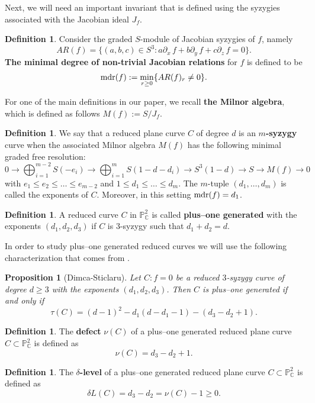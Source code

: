 \documentclass[11pt]{article}
\theoremstyle{plain}
\newtheorem{proposition}[thm]{Proposition}
\theoremstyle{definition}
\newtheorem{definition}[thm]{Definition}
\begin{document}
Next, we will need an important invariant that is defined using the syzygies associated with the Jacobian ideal $J_{f}$.
\begin{definition}
Consider the graded $S$-module of Jacobian syzygies of $f$, namely $$AR(f)=\{(a,b,c)\in S^3 : a\partial_{x} \, f + b \partial_{y} \, f + c \partial_{z} \, f = 0 \}.$$
\textbf{The minimal degree of non-trivial Jacobian relations} for $f$ is defined to be 
$${\rm mdr}(f):=\min_{r\geq 0}\{AR(f)_r\neq 0\}.$$ 
\end{definition}
For one of the main definitions in our paper, we recall \textbf{the Milnor algebra}, which is defined as follows $M(f) := S / J_{f}$.
\begin{definition}
We say that a reduced plane curve $C$ of degree $d$ is an \textbf{$m$-syzygy} curve when the associated Milnor algebra $M(f)$ has the following minimal graded free resolution:
$$0 \rightarrow \bigoplus_{i=1}^{m-2}S(-e_{i}) \rightarrow \bigoplus_{i=1}^{m}S(1-d - d_{i}) \rightarrow S^{3}(1-d)\rightarrow S \rightarrow M(f) \rightarrow 0$$
with $e_{1} \leq e_{2} \leq \ldots \leq e_{m-2}$ and $1\leq d_{1} \leq \ldots \leq d_{m}$. The $m$-tuple $(d_{1}, \ldots , d_{m})$ is called the exponents of $C$. Moreover, in this setting ${\rm mdr}(f) = d_{1}$.
\end{definition}
\begin{definition}
A reduced curve $C$ in $\mathbb{P}^{2}_{\mathbb{C}}$ is called \textbf{plus--one generated} with the exponents $(d_1,d_2, d_3)$ if $C$ is $3$-syzygy such that $d_{1}+d_{2}=d$. 
\end{definition}
In order to study plus--one generated reduced curves we will use the following characterization that comes from \cite{DS20}.
\begin{proposition}[Dimca-Sticlaru]
\label{dimspl}
Let $C: f=0$ be a reduced $3$-syzygy curve of degree $d\geq 3$ with the exponents $(d_{1},d_{2},d_{3})$. Then $C$ is plus--one generated if and only if
$$\tau(C) = (d-1)^{2} - d_{1}(d-d_{1}-1) - (d_{3}-d_{2}+1).$$
\end{proposition}
\noindent
\begin{definition}
The \textbf{defect} $\nu(C)$ of a plus--one generated reduced plane curve $C \subset \mathbb{P}^{2}_{\mathbb{C}}$ is defined as
$$\nu(C) = d_{3}-d_{2}+1.$$
\end{definition}
\begin{definition}
The \textbf{$\delta$-level} of a plus--one generated reduced plane curve $C \subset \mathbb{P}^{2}_{\mathbb{C}}$ is defined as
$$\delta L(C) = d_{3} - d_{2} = \nu(C)-1 \geq 0.$$ 
\end{definition}
\end{document}
